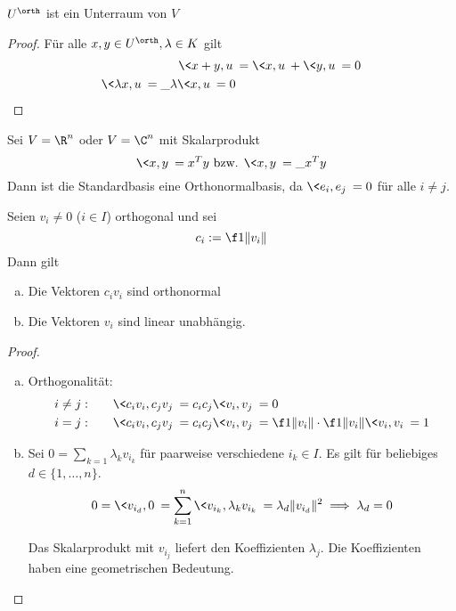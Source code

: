 \documentclass{mycourse}
\begin{document}
\begin{st*}
	$U^\orth$ ist ein Unterraum von $V$
	\begin{proof}
		Für alle $x,y\in U^\orth, \lambda \in K$ gilt
		\begin{align*}
			\<x+y, u\> &= \<x,u\> + \<y,u\> = 0\\
			\<\lambda x, u\> = \_\lambda \<x,u\> = 0
		\end{align*}
	\end{proof}	
\end{st*}

\begin{ex}
	Sei $V=\R^n$ oder $V=\C^n$ mit Skalarprodukt
	\[
		\<x,y\> = x^Ty \text{ bzw. }\<x,y\>=\_{x}^Ty
	\]
	Dann ist die Standardbasis eine Orthonormalbasis, da $\<e_i, e_j\> = 0$ für alle $i\neq j$.
\end{ex}

\begin{lem}
	\label{lem:13.8}
	Seien $v_i \neq 0$ ($i\in I$) orthogonal und sei 
	\[
		c_i := \f 1{\|v_i\|}
	\]
	Dann gilt
	\begin{enumerate}[(a)]
		\item
			Die Vektoren $c_i v_i$ sind orthonormal
		\item
			Die Vektoren $v_i$ sind linear unabhängig.
	\end{enumerate}
	\begin{proof}
		\begin{enumerate}[(a)]
			\item
				Orthogonalität:
				\begin{align*}
					i\neq j: &\qquad \<c_i v_i, c_j v_j\> = c_ic_j\< v_i,v_j\> = 0\\
					i = j: &\qquad \<c_i v_i, c_j v_j\> = c_ic_j\< v_i,v_j\> = \f 1{\|v_i\|}\cdot \f 1{\|v_i\|} \<v_i,v_i\> = 1
				\end{align*}
			\item
				Sei $0= \sum_{k=1}\lambda_k v_{i_k}$ für paarweise verschiedene $i_k\in I$.
				Es gilt für beliebiges $d \in \{1,\dotsc, n\}$.
				\[
					0 = \<v_{i_d}, 0\> = \sum_{k=1}^n\<v_{i_k},\lambda_k v_{i_k}\> = \lambda_d \|v_{i_d}\|^2 \implies \lambda_d = 0
				\]
				\begin{note}
					Das Skalarprodukt mit $v_{i_j}$ liefert den Koeffizienten $\lambda_j$.
					Die Koeffizienten haben eine geometrischen Bedeutung.
				\end{note}
		\end{enumerate}
	\end{proof}
\end{lem}
\end{document}
